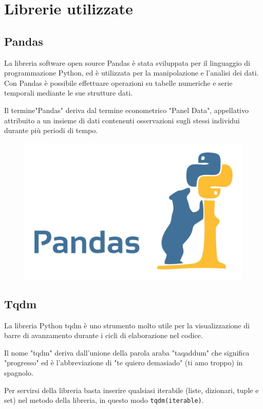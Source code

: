 \section{Librerie utilizzate}
\subsection{Pandas}
La libreria software open source Pandas è stata sviluppata per il linguaggio di programmazione Python, ed è utilizzata per la manipolazione e l'analisi dei dati. Con Pandas è possibile effettuare operazioni su tabelle numeriche e serie temporali mediante le sue strutture dati. 

Il termine"Pandas" deriva dal termine econometrico "Panel Data", appellativo attribuito a un insieme di dati contenenti osservazioni sugli stessi individui durante più periodi di tempo.

\begin{figure}
    \begin{center}    
        \includegraphics[width=0.9\linewidth]{images/image4.jpeg}
    \end{center}
\end{figure}

\subsection{Tqdm}
La libreria Python tqdm \cite{Tqdm} è uno strumento molto utile per la visualizzazione di barre di avanzamento durante i cicli di elaborazione nel codice. 

Il nome "tqdm" deriva dall'unione della parola araba "taqaddum" che significa "progresso" ed è l'abbreviazione di "te quiero demasiado" (ti amo troppo) in spagnolo. 

Per servirsi della libreria basta inserire qualsiasi iterabile (liste, dizionari, tuple e set) nel metodo della libreria, in questo modo \texttt{tqdm(iterable)}. 

